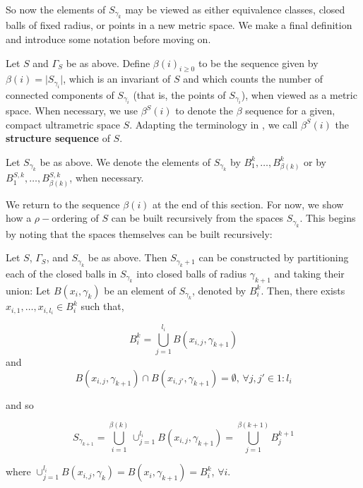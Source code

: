 So now the elements of $S_{\gamma_k}$ may be viewed as either equivalence classes, closed balls of fixed radius, or points in a new metric space. We  make a final definition and introduce some notation before moving on.

\begin{definition*}
Let $S$ and $\Gamma_S$ be as above. Define $\beta(i)_{i \geq 0}$ to be the sequence given by $\beta(i) = \lvert  S_{\gamma_i}\rvert$, which is an invariant of $S$ and which counts the number of connected components of $S_{\gamma_i}$ (that is, the points of $S_{\gamma_i}$), when viewed as a metric space. When necessary, we use $\beta^S(i)$ to denote the $\beta$ sequence for a given, compact  ultrametric space $S$. Adapting the terminology in \cite{fp}, we call $\beta^S(i)$ the \textbf{structure sequence} of $S$.
\end{definition*}

\begin{notation*}
Let $S_{\gamma_k}$ be as above. We denote the elements of $S_{\gamma_k}$ by $B^k_1, \ldots, B^k_{\beta(k)}$ or by $B^{S,k}_1, \ldots, B^{S,k}_{\beta(k)}$, when necessary.
\end{notation*}


We return to the sequence $\beta(i)$ at the end of this section. For now, we show how a $\rho-$ordering of $S$ can be built recursively from the spaces $S_{\gamma_k}$. This begins by noting that the spaces themselves can be built recursively:

\begin{observation*}
Let $S$, $\Gamma_S$, and $S_{\gamma_k}$ be as above. Then $S_{\gamma_k+1}$ can be constructed by partitioning each of the closed balls in $S_{\gamma_k}$ into closed balls of radius $\gamma_{k+1}$ and taking their union:  Let $B(x_i, \gamma_k)$  be an element of $S_{\gamma_k}$, denoted by  $B^k_i$. Then, there exists $x_{i,1},\ldots, x_{i,l_{i}} \in B^k_i$ such that,

\[B^k_i=  \bigcup_{j=1}^{l_i} B(x_{i,j}, \gamma_{k+1})\] and  \[B(x_{i,j}, \gamma_{k+1}) \cap B(x_{i,j'}, \gamma_{k+1}) = \emptyset \text{, }\forall j,j' \in 1:l_i\] 

and so

\[S_{\gamma_{k+1}} =  \bigcup_{i=1}^{\beta(k)}   \cup_{j=1}^{l_i} B(x_{i,j}, \gamma_{k+1}) = \bigcup^{\beta(k+1)}_{j=1}B^{k+1}_{j}\] 


where $\cup_{j=1}^{l_i} B(x_{i,j},\gamma_{k})=B(x_i, \gamma_{k+1}) = B^k_i$, $\forall i$.
\end{observation*}

